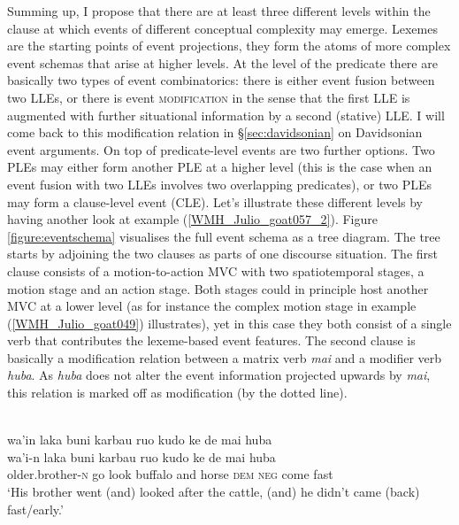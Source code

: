 Summing up, I propose that there are at least three different levels within the clause at which events of different conceptual complexity may emerge. Lexemes are the starting points of event projections, they form the atoms of more complex event schemas that arise at higher levels. At the level of the predicate there are basically two types of event combinatorics: there is either event fusion between two LLEs, or there is event \textsc{modification} in the sense that the first LLE is augmented with further situational information by a second (stative) LLE. I will come back to this modification relation in §\ref{sec:davidsonian} on Davidsonian event arguments. On top of predicate-level events are two further options. Two PLEs may either form another PLE at a higher level (this is the case when an event fusion with two LLEs involves two overlapping predicates), or two PLEs may form a clause-level event (CLE). Let's illustrate these different levels by having another look at example (\ref{WMH_Julio_goat057_2}). Figure \ref{figure:eventschema} visualises the full event schema as a tree diagram. The tree starts by adjoining the two clauses as parts of one discourse situation. The first clause consists of a motion-to-action MVC with two spatiotemporal stages, a motion stage and an action stage. Both stages could in principle host another MVC at a lower level (as for instance the complex motion stage in example (\ref{WMH_Julio_goat049}) illustrates), yet in this case they both consist of a single verb that contributes the lexeme-based event features. The second clause is basically a modification relation between a matrix verb \textit{mai} and a modifier verb \textit{huba}. As \textit{huba} does not alter the event information projected upwards by \textit{mai}, this relation is marked off as modification (by the dotted line).

\ea \label{WMH_Julio_goat057_2}
\\
\glll wa'in laka buni karbau ruo kudo ke de mai huba \\
wa'i-n laka buni karbau ruo kudo ke de mai huba \\
older.brother-\textsc{n} go look buffalo and horse \textsc{dem} \textsc{neg} come fast\\
\glft `His brother went (and) looked after the cattle, (and) he didn't came (back) fast/early.'\\ 
\z

